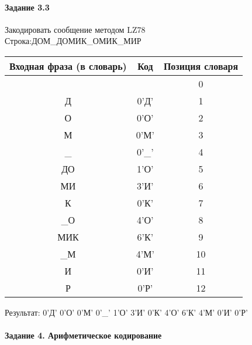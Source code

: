 \documentclass[a4paper, 12pt]{article}
\begin{document}
\paragraph{Задание 3.3}

Закодировать сообщение методом LZ78\\
Строка:ДОМ\_ДОМИК\_ОМИК\_МИР\\
\begin{table}[h!]
\centering
\begin{tabular}{|c|c|c|} 
\hline
 Входная фраза (в словарь) & Код & Позиция словаря \\ \hline

 &  & 0 \\ \hline
Д & 0'Д' & 1 \\ \hline
О & 0'О' & 2 \\ \hline
М & 0'М' & 3 \\ \hline
\_ & 0'\_' & 4 \\ \hline
ДО & 1'О' & 5 \\ \hline
МИ & 3'И' & 6 \\ \hline
К & 0'К' & 7 \\ \hline
\_О & 4'О' & 8 \\ \hline
МИК & 6'К' & 9 \\ \hline
\_М & 4'М' & 10 \\ \hline
И & 0'И' & 11 \\ \hline
Р & 0'Р' & 12 \\ \hline
\end{tabular}
\end{table}

Результат: 0'Д' 0'О' 0'М' 0'\_' 1'О' 3'И' 0'К' 4'О' 6'К' 4'М' 0'И' 0'Р'\\
\pagebreak
\paragraph{Задание 4. Арифметическое кодирование\\}
\end{document}
